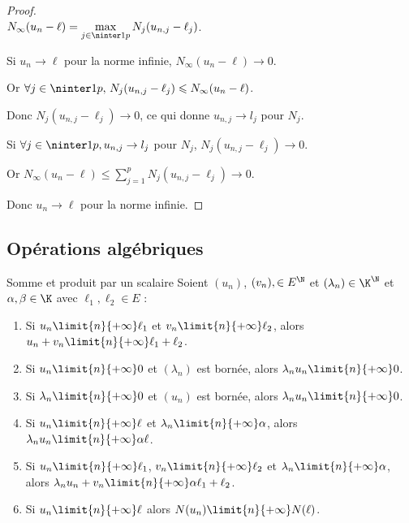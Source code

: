 \begin{proof}~\\
    $\displaystyle N_\infty(u_n - \ell) = \max_{j \in \ninter 1 p} N_j(u_{n, j} - \ell_j)$.

    Si $u_n \to \ell$ pour la norme infinie, $N_\infty(u_n - \ell) \to 0$.

    Or $\forall j \in \ninter 1 p, \, N_j(u_{n, j}- \ell_j) \leqslant N_\infty(u_n - \ell)$.

    Donc $N_j(u_{n, j} - \ell_j) \to 0$,
    ce qui donne $u_{n, j} \to l_j$ pour $N_j$.

    Si $\forall j \in \ninter 1 p, u_{n, j} \to l_j$ pour $N_j$, $N_j(u_{n, j} - \ell_j) \to 0$.

    Or $\displaystyle N_\infty(u_n - \ell) \leqslant \sum_{j = 1}^{p } N_j(u_{n, j} - \ell_j) \to 0$.

    Donc $u_n \to \ell$ pour la norme infinie. 
\end{proof}

\subsection{Opérations algébriques}

\begin{proposition}{Somme et produit par un scalaire}{}
    Soient $(u_n)$, $(v_n), \in E^{\N}$ et $(\lambda_n) \in \K^{\N}$ 
    et $\alpha, \beta \in \K$ avec $\ell_1, \ell_2 \in E$ :

    \begin{enumerate}
        \item Si $u_n \limit{n}{+\infty} \ell_1$ et $v_n \limit{n}{+\infty} \ell_2$, alors 
            $u_n + v_n \limit{n}{+\infty} \ell_1 + \ell_2$.
        \item Si $u_n \limit{n}{+\infty} 0$ et $(\lambda_n)$ est bornée,
            alors $\lambda_n u_n \limit{n}{+\infty} 0$.
        \item Si $\lambda_n \limit{n}{+\infty} 0$ et $(u_n)$ est bornée, 
            alors $\lambda_n u_n \limit{n}{+\infty} 0$.
        \item Si $u_n \limit{n}{+\infty} \ell$ et $\lambda_n \limit{n}{+\infty} \alpha$, alors
            $\lambda_n u_n \limit{n}{+\infty} \alpha \ell$.
        \item Si $u_n \limit{n}{+\infty} \ell_1$, $v_n \limit{n}{+\infty} \ell_2$ 
            et $\lambda_n \limit{n}{+\infty} \alpha$, alors
            $\lambda_n u_n + v_n \limit{n}{+\infty} \alpha \ell_1 + \ell_2$.
        \item Si $u_n \limit{n}{+\infty} \ell$ alors $N(u_n) \limit{n}{+\infty} N(\ell)$.
    \end{enumerate}
\end{proposition}

